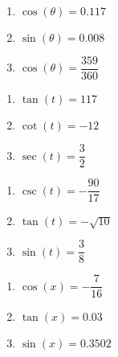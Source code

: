 \begin{multicols}{3}

\begin{enumerate}

\setcounter{enumi}{\value{HW}}

\item $\cos(\theta) = 0.117$ 
\item $\sin(\theta) = 0.008$ 
\item $\cos(\theta) = \dfrac{359}{360}$

\setcounter{HW}{\value{enumi}}

\end{enumerate}

\end{multicols}

\begin{multicols}{3}

\begin{enumerate}

\setcounter{enumi}{\value{HW}}

\item $\tan(t) = 117$ 
\item $\cot(t) = -12$ 
\item $\sec(t) = \dfrac{3}{2}$

\setcounter{HW}{\value{enumi}}

\end{enumerate}

\end{multicols}

\begin{multicols}{3}

\begin{enumerate}

\setcounter{enumi}{\value{HW}}

\item $\csc(t) = -\dfrac{90}{17}$
\item $\tan(t) = -\sqrt{10}$ 
\item $\sin(t) = \dfrac{3}{8}$

\setcounter{HW}{\value{enumi}}

\end{enumerate}

\end{multicols}

\begin{multicols}{3}

\begin{enumerate}

\setcounter{enumi}{\value{HW}}

\item $\cos(x) = -\dfrac{7}{16}$
\item $\tan(x) = 0.03$ 
\item $\sin(x) = 0.3502$ 

\setcounter{HW}{\value{enumi}}

\end{enumerate}

\end{multicols}

